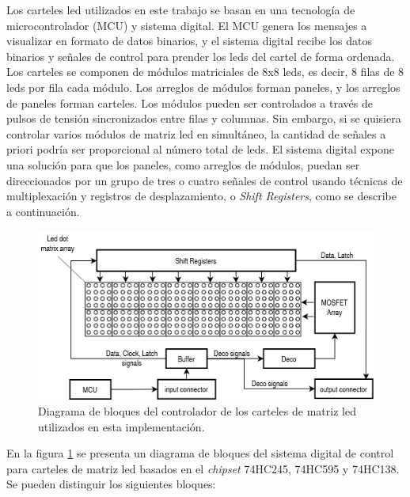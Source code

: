 Los carteles led utilizados en este trabajo se basan en una tecnología de microcontrolador (MCU) y sistema digital. El MCU genera los mensajes a visualizar en formato de datos binarios, y el sistema digital recibe los datos binarios y señales de control para prender los leds del cartel de forma ordenada. Los carteles se componen de módulos matriciales de 8x8 leds, es decir, 8 filas de 8 leds por fila cada módulo. Los arreglos de módulos forman paneles, y los arreglos de paneles forman carteles. Los módulos  pueden ser controlados a través de pulsos de tensión sincronizados entre filas y columnas. Sin embargo, si se quisiera controlar varios módulos de matriz led en simultáneo, la cantidad de señales a priori podría ser proporcional al número total de leds. El sistema digital expone una solución para que los paneles, como arreglos de módulos, puedan ser direccionados por un grupo de tres o cuatro señales de control usando técnicas de multiplexación y registros de desplazamiento, o \textit{Shift Registers}, como se describe a continuación. \\


\begin{figure}[ht]
	\centering
	\includegraphics[width=1\textwidth]{./Figures/diagDriverled.png}
	\caption{Diagrama de bloques del controlador de los carteles de matriz led utilizados en esta implementación.}
	\label{fig:diagDriverled}
\end{figure}

En la figura \ref{fig:diagDriverled} se presenta un diagrama de bloques del sistema digital de control para carteles de matriz led basados en el \textit{chipset} 74HC245, 74HC595 y 74HC138. Se pueden distinguir los siguientes bloques:

